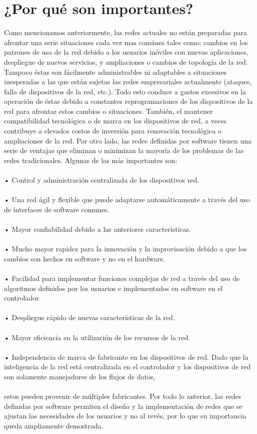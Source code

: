 \documentclass[12pt]{report}
\begin{document}
\section{¿Por qué son importantes?}
{
Como mencionamos anteriormente, las redes actuales no están preparadas para afrontar una serie situaciones
cada vez mas comúnes tales como: cambios en los patrones de uso de la red debido a los usuarios móviles con
nuevas aplicaciones, despliegue de nuevos servicios, y ampliaciones o cambios de topología de la red. Tampoco
éstas son fácilmente administrables ni adaptables a situaciones inesperadas a las que están sujetas las redes
empresariales actualmente (ataques, falla de dispositivos de la red, etc.). Todo esto conduce a gastos excesivos
en la operación de éstas debido a constantes reprogramaciones de los dispositivos de la red para afrontar estos
cambios o situaciones. También, el mantener compatibilidad tecnológica o de marca en los dispositivos de red, a
veces contribuye a elevados costos de inversión para renovación tecnológica o ampliaciones de la red.
Por otro lado, las redes definidas por software tienen una serie de ventajas que eliminan o minimizan la
mayoría de los problemas de las redes tradicionales. Algunas de las más importantes son:\\\\
• Control y administración centralizada de los dispositivos red.\\\\
• Una red ágil y flexible que puede adaptarse automáticamente a través del uso de interfaces de software
comunes.\\\\
• Mayor confiabilidad debido a las anteriores características.\\\\
• Mucho mayor rapidez para la innovación y la improvisación debido a que los cambios son hechos en
software y no en el hardware.\\\\
• Facilidad para implementar funciones complejas de red a través del uso de algoritmos definidos por los
usuarios e implementados en software en el controlador.\\\\
• Despliegue rápido de nuevas características de la red.\\\\
• Mayor eficiencia en la utilización de los recursos de la red.\\\\
• Independencia de marca de fabricante en los dispositivos de red. Dado que la inteligencia de la red está
centralizada en el controlador y los dispositivos de red son solamente manejadores de los flujos de datos,\\\\
estos pueden provenir de múltiples fabricantes.
Por todo lo anterior, las redes definidas por software permiten el diseño y la implementación de redes que se
ajustan las necesidades de los usuarios y no al revés, por lo que su importancia queda ampliamente demostrada.
}
\end{document}

